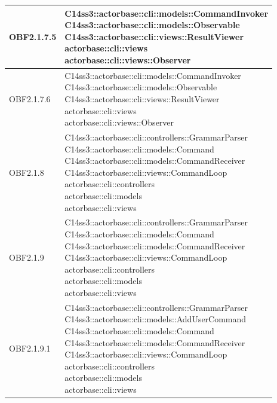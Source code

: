\documentclass{scalatekids-article}
\begin{document}
\begin{longtable}[H]{|p{4.5cm}|p{13cm}|}
\hline
OBF2.1.7.5 & \multiLineCell[t]{C14ss3::actorbase::cli::models::CommandInvoker\\C14ss3::actorbase::cli::models::Observable\\C14ss3::actorbase::cli::views::ResultViewer\\actorbase::cli::views\\actorbase::cli::views::Observer\\}\\
\hline
OBF2.1.7.6 & \multiLineCell[t]{C14ss3::actorbase::cli::models::CommandInvoker\\C14ss3::actorbase::cli::models::Observable\\C14ss3::actorbase::cli::views::ResultViewer\\actorbase::cli::views\\actorbase::cli::views::Observer\\}\\
\hline
OBF2.1.8 & \multiLineCell[t]{C14ss3::actorbase::cli::controllers::GrammarParser\\C14ss3::actorbase::cli::models::Command\\C14ss3::actorbase::cli::models::CommandReceiver\\C14ss3::actorbase::cli::views::CommandLoop\\actorbase::cli::controllers\\actorbase::cli::models\\actorbase::cli::views\\}\\
\hline
OBF2.1.9 & \multiLineCell[t]{C14ss3::actorbase::cli::controllers::GrammarParser\\C14ss3::actorbase::cli::models::Command\\C14ss3::actorbase::cli::models::CommandReceiver\\C14ss3::actorbase::cli::views::CommandLoop\\actorbase::cli::controllers\\actorbase::cli::models\\actorbase::cli::views\\}\\
\hline
OBF2.1.9.1 & \multiLineCell[t]{C14ss3::actorbase::cli::controllers::GrammarParser\\C14ss3::actorbase::cli::models::AddUserCommand\\C14ss3::actorbase::cli::models::Command\\C14ss3::actorbase::cli::models::CommandReceiver\\C14ss3::actorbase::cli::views::CommandLoop\\actorbase::cli::controllers\\actorbase::cli::models\\actorbase::cli::views\\}\\

\end{longtable}
\end{document}
